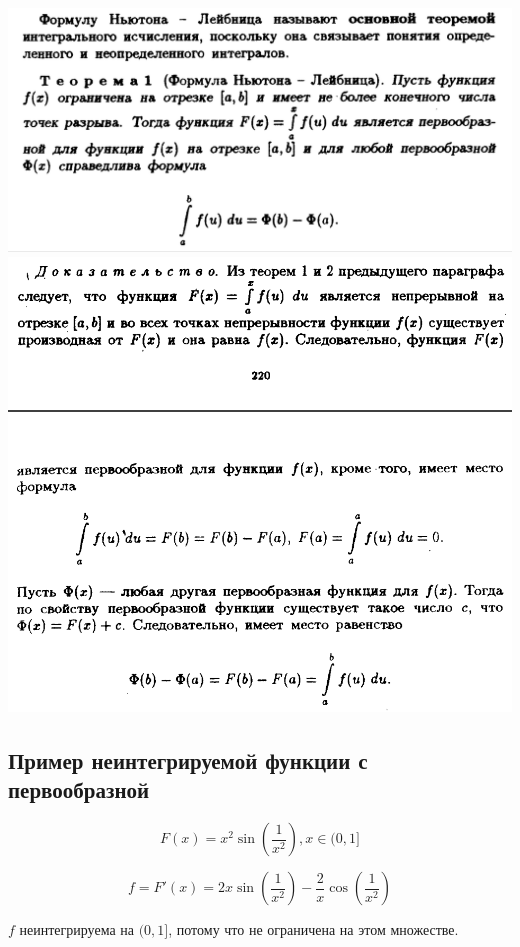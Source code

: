 \documentclass[a4paper]{article}
\begin{document}
\begin{definit}
\includegraphics[width=17cm]{sadovnichy2.png}
\includegraphics[width=17cm]{sadovnichy3.png}
\end{definit}

\begin{definit}
\hypertarget{p14}{}
\subsection*{Пример неинтегрируемой функции с первообразной}

\[
F(x) = x^2 \sin \left( \frac{1}{x^2} \right), x \in (0,1]
\]

\[
f = F'(x) = 2x \sin \left( \frac{1}{x^2} \right) - \frac{2}{x} \cos \left( \frac{1}{x^2} \right)
\]

$f$ неинтегрируема на $(0,1]$, потому что не ограничена на этом множестве.
\end{definit}
\end{document}
